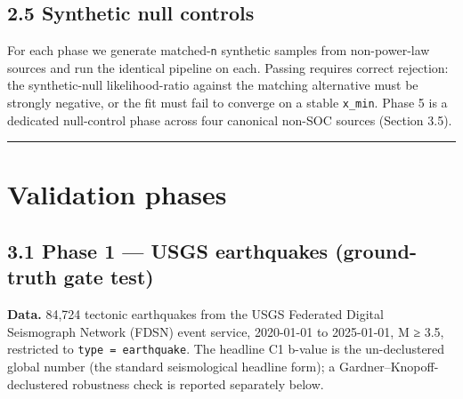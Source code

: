 \documentclass[
  11pt]{article}
\begin{document}
\subsection{2.5 Synthetic null
controls}\label{25-synthetic-null-controls}

For each phase we generate matched-\texttt{n} synthetic samples from
non-power-law sources and run the identical pipeline on each. Passing
requires correct rejection: the synthetic-null likelihood-ratio against
the matching alternative must be strongly negative, or the fit must fail
to converge on a stable \texttt{x\_min}. Phase 5 is a dedicated
null-control phase across four canonical non-SOC sources (Section 3.5).

\begin{center}\rule{0.5\linewidth}{0.5pt}\end{center}

\section{Validation phases}\label{sec:3}


\subsection{3.1 Phase 1 --- USGS earthquakes (ground-truth gate
test)}\label{31-phase-1--usgs-earthquakes-ground-truth-gate-test}

\textbf{Data.} 84,724 tectonic earthquakes from the USGS Federated
Digital Seismograph Network (FDSN) event service, 2020-01-01 to
2025-01-01, M ≥ 3.5, restricted to \texttt{type\ =\ earthquake}. The
headline C1 b-value is the un-declustered global number (the standard
seismological headline form); a Gardner--Knopoff-declustered robustness
check is reported separately below.
\end{document}
